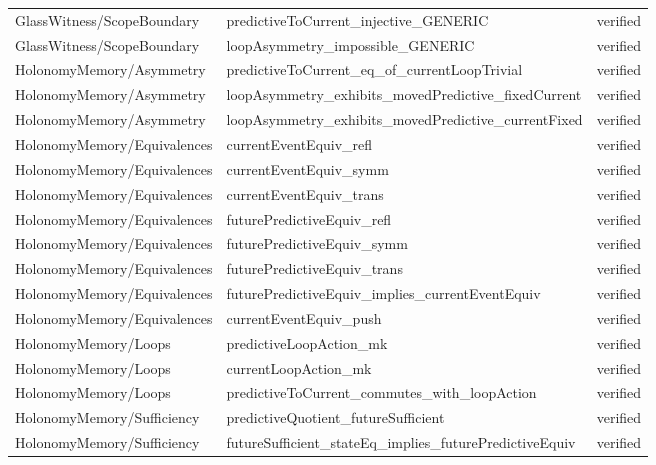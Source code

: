 \begin{longtable}{>{\raggedright\arraybackslash}p{3.6cm}>{\raggedright\arraybackslash}p{8.4cm}p{2.9cm}}
GlassWitness/\allowbreak{}ScopeBoundary & predictiveToCurrent\_\allowbreak{}injective\_\allowbreak{}GENERIC & verified \\
GlassWitness/\allowbreak{}ScopeBoundary & loopAsymmetry\_\allowbreak{}impossible\_\allowbreak{}GENERIC & verified \\
HolonomyMemory/\allowbreak{}Asymmetry & predictiveToCurrent\_\allowbreak{}eq\_\allowbreak{}of\_\allowbreak{}currentLoopTrivial & verified \\
HolonomyMemory/\allowbreak{}Asymmetry & loopAsymmetry\_\allowbreak{}exhibits\_\allowbreak{}movedPredictive\_\allowbreak{}fixedCurrent & verified \\
HolonomyMemory/\allowbreak{}Asymmetry & loopAsymmetry\_\allowbreak{}exhibits\_\allowbreak{}movedPredictive\_\allowbreak{}currentFixed & verified \\
HolonomyMemory/\allowbreak{}Equivalences & currentEventEquiv\_\allowbreak{}refl & verified \\
HolonomyMemory/\allowbreak{}Equivalences & currentEventEquiv\_\allowbreak{}symm & verified \\
HolonomyMemory/\allowbreak{}Equivalences & currentEventEquiv\_\allowbreak{}trans & verified \\
HolonomyMemory/\allowbreak{}Equivalences & futurePredictiveEquiv\_\allowbreak{}refl & verified \\
HolonomyMemory/\allowbreak{}Equivalences & futurePredictiveEquiv\_\allowbreak{}symm & verified \\
HolonomyMemory/\allowbreak{}Equivalences & futurePredictiveEquiv\_\allowbreak{}trans & verified \\
HolonomyMemory/\allowbreak{}Equivalences & futurePredictiveEquiv\_\allowbreak{}implies\_\allowbreak{}currentEventEquiv & verified \\
HolonomyMemory/\allowbreak{}Equivalences & currentEventEquiv\_\allowbreak{}push & verified \\
HolonomyMemory/\allowbreak{}Loops & predictiveLoopAction\_\allowbreak{}mk & verified \\
HolonomyMemory/\allowbreak{}Loops & currentLoopAction\_\allowbreak{}mk & verified \\
HolonomyMemory/\allowbreak{}Loops & predictiveToCurrent\_\allowbreak{}commutes\_\allowbreak{}with\_\allowbreak{}loopAction & verified \\
HolonomyMemory/\allowbreak{}Sufficiency & predictiveQuotient\_\allowbreak{}futureSufficient & verified \\
HolonomyMemory/\allowbreak{}Sufficiency & futureSufficient\_\allowbreak{}stateEq\_\allowbreak{}implies\_\allowbreak{}futurePredictiveEquiv & verified \\

\end{longtable}
